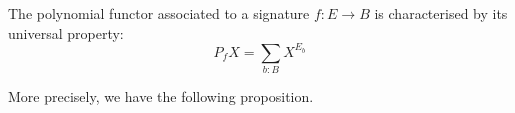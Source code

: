 
The polynomial functor associated to a signature $f : E \to B$
is characterised by its universal property:
\[ P_f X = \sum_{b : B} X^{E_b}\]

More precisely, we have the following proposition.

